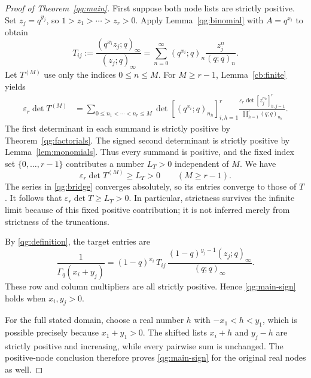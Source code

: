 \documentclass[11pt,a4paper]{article}
\theoremstyle{definition}
\theoremstyle{remark}
\newcommand{\ep}{\varepsilon}
\begin{document}
\begin{proof}[Proof of Theorem~\ref{qg:main}]
First suppose both node lists are strictly positive. Set
\(z_j=q^{y_j}\), so \(1>z_1>\cdots>z_r>0\). Apply
Lemma~\ref{qg:binomial} with \(A=q^{x_i}\) to obtain
\begin{equation}\label{qg:bridge}
 T_{ij}:=\frac{(q^{x_i}z_j;q)_\infty}{(z_j;q)_\infty}
 =\sum_{n=0}^{\infty}
   (q^{x_i};q)_n\frac{z_j^n}{(q;q)_n}.
\end{equation}
Let \(T^{(M)}\) use only the indices \(0\le n\le M\).
For \(M\ge r-1\), Lemma~\ref{cb:finite} yields
\begin{align}\label{qg:second-cb}
 \ep_r\det T^{(M)}
 &=\sum_{0\le n_1<\cdots<n_r\le M}
   \det[(q^{x_i};q)_{n_h}]_{i,h=1}^r
   \frac{\ep_r\det[z_j^{n_h}]_{h,j=1}^r}
        {\prod_{h=1}^r(q;q)_{n_h}}.
\end{align}
The first determinant in each summand is strictly positive by
Theorem~\ref{qg:factorials}. The signed second determinant is
strictly positive by Lemma~\ref{lem:monomials}. Thus every summand
is positive, and the fixed index set \(\{0,\ldots,r-1\}\)
contributes a number \(L_T>0\) independent of \(M\). We have
\[
 \ep_r\det T^{(M)}\ge L_T>0\qquad(M\ge r-1).
\]
The series in \eqref{qg:bridge} converges absolutely, so its entries
converge to those of \(T\). It follows that
\(\ep_r\det T\ge L_T>0\). In particular, strictness survives
the infinite limit because of this fixed positive contribution;
it is not inferred merely from strictness of the truncations.

By \eqref{qg:definition}, the target entries are
\begin{equation}\label{qg:row-column-scaling}
 \frac{1}{\Gamma_q(x_i+y_j)}
 =(1-q)^{x_i}\,T_{ij}\,
   \frac{(1-q)^{y_j-1}(z_j;q)_\infty}{(q;q)_\infty}.
\end{equation}
These row and column multipliers are all strictly positive. Hence
\eqref{qg:main-sign} holds when \(x_i,y_j>0\).

For the full stated domain, choose a real number \(h\) with
\(-x_1<h<y_1\), which is possible precisely because
\(x_1+y_1>0\). The shifted lists \(x_i+h\) and \(y_j-h\)
are strictly positive and increasing, while every pairwise sum is
unchanged. The positive-node conclusion therefore proves
\eqref{qg:main-sign} for the original real nodes as well.
\end{proof}
\end{document}

